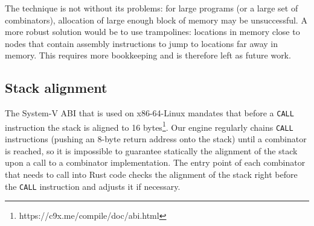 \documentclass[conference]{IEEEtran}
\begin{document}
The technique is not without its problems: for large programs (or a large set of combinators), allocation of large enough block of memory may be unsuccessful.
A more robust solution would be to use trampolines: locations in memory close to nodes that contain assembly instructions to jump to locations far away in memory.
This requires more bookkeeping and is therefore left as future work.

\subsection{Stack alignment}
The System-V ABI that is used on x86-64-Linux mandates that before a \texttt{CALL} instruction the stack is aligned to 16 bytes\footnote{https://c9x.me/compile/doc/abi.html}.
Our engine regularly chains \texttt{CALL} instructions (pushing an 8-byte return address onto the stack) until a combinator is reached, so it is impossible to guarantee statically the alignment of the stack upon a call to a combinator implementation.
The entry point of each combinator that needs to call into Rust code checks the alignment of the stack right before the \texttt{CALL} instruction and adjusts it if necessary.

\end{document}
